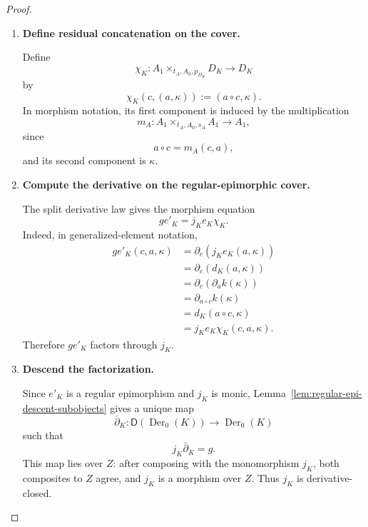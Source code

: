 \begin{proof}
\begin{enumerate}
        \item \textbf{Define residual concatenation on the cover.}

        Define
        \[
            \chi_K:
            A_1\times_{t_A,A_0,p_{D_K}}D_K
            \to
            D_K
        \]
        by
        \[
            \chi_K(c,(a,\kappa))
            :=
            (a\circ c,\kappa).
        \]
        In morphism notation, its first component is induced by the
        multiplication
        \[
            m_A:
            A_1\times_{t_A,A_0,s_A}A_1\to A_1,
        \]
        since
        \[
            a\circ c=m_A(c,a),
        \]
        and its second component is \(\kappa\).

        \item \textbf{Compute the derivative on the regular-epimorphic cover.}

        The split derivative law gives the morphism equation
        \[
            g e'_K
            =
            j_Ke_K\chi_K.
        \]
        Indeed, in generalized-element notation,
        \[
            \begin{aligned}
                g e'_K(c,a,\kappa)
                &=
                \partial_c(j_Ke_K(a,\kappa))
                \\
                &=
                \partial_c(d_K(a,\kappa))
                \\
                &=
                \partial_c(\partial_a k(\kappa))
                \\
                &=
                \partial_{a\circ c}k(\kappa)
                \\
                &=
                d_K(a\circ c,\kappa)
                \\
                &=
                j_Ke_K\chi_K(c,a,\kappa).
            \end{aligned}
        \]
        Therefore \(ge'_K\) factors through \(j_K\).

        \item \textbf{Descend the factorization.}

        Since \(e'_K\) is a regular epimorphism and \(j_K\) is monic,
        Lemma~\ref{lem:regular-epi-descent-subobjects} gives a unique map
        \[
            \bar\partial_K:
            \mathsf D(\operatorname{Der}_0(K))
            \to
            \operatorname{Der}_0(K)
        \]
        such that
        \[
            j_K\bar\partial_K=g.
        \]
        This map lies over \(Z\): after composing with the monomorphism
        \(j_K\), both composites to \(Z\) agree, and \(j_K\) is a morphism
        over \(Z\). Thus \(j_K\) is derivative-closed.


\end{enumerate}
\end{proof}
